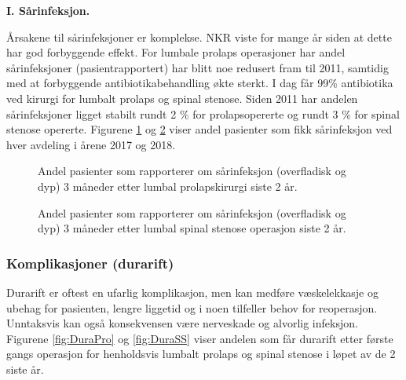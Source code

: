 \documentclass [norsk,a4paper,twoside]{article}\usepackage[]{graphicx}\usepackage[]{color}
\begin{document}
\textbf{I. Sårinfeksjon.}

Årsakene til sårinfeksjoner er komplekse. NKR viste for mange år siden at dette har god forbyggende effekt. For lumbale prolaps operasjoner har
andel sårinfeksjoner (pasientrapportert) har blitt noe redusert fram til 2011, samtidig med at forbyggende antibiotikabehandling økte sterkt. I dag får 99\% antibiotika ved kirurgi for lumbalt prolaps og spinal stenose. Siden 2011 har andelen sårinfeksjoner ligget stabilt rundt 2 \% for prolapsopererte og rundt 3 \% for spinal stenose opererte.
Figurene \ref{fig:KpInfAvdPro} og \ref{fig:KpInfAvdSS} viser andel pasienter som fikk sårinfeksjon ved 
hver avdeling i årene 2017 og 2018.

      





\begin{figure}[ht]
\caption{\label{fig:KpInfAvdPro} Andel pasienter som rapporterer om sårinfeksjon 
      (overfladisk og dyp) 3 måneder etter lumbal prolapskirurgi siste 2 år.}
\end{figure}

\begin{figure}[ht]
\caption{\label{fig:KpInfAvdSS} Andel pasienter som rapporterer om sårinfeksjon 
      (overfladisk og dyp) 3 måneder etter lumbal spinal stenose operasjon siste 2 år.}
\end{figure}

\clearpage

\subsubsection{Komplikasjoner (durarift)}


Durarift er oftest en ufarlig komplikasjon, men kan medføre væskelekkasje og
ubehag for pasienten, lengre liggetid og i noen tilfeller behov for reoperasjon.
Unntaksvis kan også konsekvensen være nerveskade og alvorlig infeksjon. Figurene \ref{fig:DuraPro} og \ref{fig:DuraSS} 
viser andelen som får durarift etter første gangs operasjon for henholdsvis lumbalt prolaps og spinal stenose i løpet av de 2 siste år.
\end{document}
